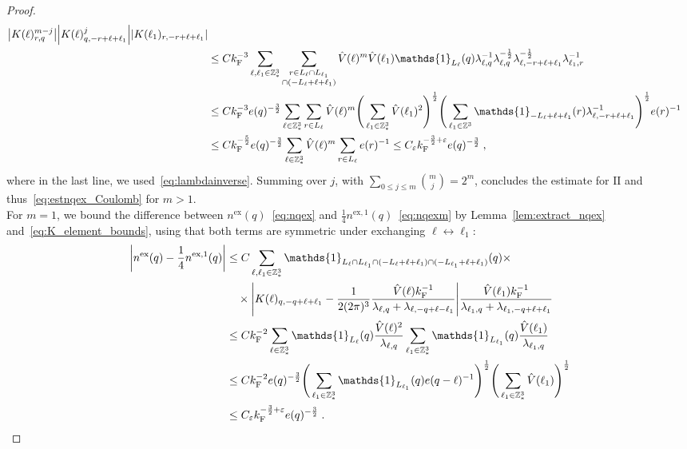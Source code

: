 \documentclass[12pt,a4paper]{article}
\numberwithin{equation}{section}
\newcommand{\1}{\mathbb{I}}
\newcommand{\ex}{\mathrm{ex}}
\newcommand{\F}{\mathrm{F}}
\newcommand{\II}{\mathrm{II}}
\newcommand{\Z}{\mathbb{Z}}
\newcommand{\half}{\frac{1}{2}}
\theoremstyle{plain}
\theoremstyle{definition}
\theoremstyle{remark}
\theoremstyle{plain}
\theoremstyle{definition}
\theoremstyle{remark}
\begin{document}
\begin{proof}
\begin{align}
		\abs{K(\ell)^{m-j}_{r,q}}
		\abs{K(\ell)^j_{q,-r+\ell+\ell_1}}
		\abs{K(\ell_1)_{r,-r+\ell+\ell_1}} \nonumber\\
	&\leq C k_{\F}^{-3} \sum_{\ell,\ell_1 \in \Z^3_*} \sum_{\substack{r \in L_\ell \cap L_{\ell_1} \\ \cap (-L_{\ell}+\ell+\ell_1)}}
		\hat{V}(\ell)^m \hat{V}(\ell_1)
		\mathds{1}_{L_\ell}(q)
		\lambda_{\ell,q}^{-1} \lambda_{\ell,q}^{-\half} \lambda_{\ell,-r+\ell+\ell_1}^{-\half} \lambda_{\ell_1,r}^{-1} \nonumber\\
	&\leq C k_{\F}^{-3} e(q)^{-\frac 32} \sum_{\ell \in \Z^3_*} \sum_{r \in L_\ell}
		\hat{V}(\ell)^m
		\Bigg( \sum_{\ell_1 \in \Z^3_*} \hat{V}(\ell_1)^2  \Bigg)^{\half}
		\Bigg( \sum_{\ell_1 \in \Z^3} \mathds{1}_{-L_{\ell}+\ell+\ell_1}(r) \lambda_{\ell,-r+\ell+\ell_1}^{-1} \Bigg)^{\half}
		 e(r)^{-1} \nonumber\\
	&\leq C k_{\F}^{-\frac 52} e(q)^{-\frac 32} \sum_{\ell \in \Z^3_*} \hat{V}(\ell)^m
	\sum_{r \in L_\ell} e(r)^{-1}
	\leq C_\varepsilon k_{\F}^{-\frac 32 + \varepsilon} e(q)^{-\frac 32} \;,
\end{align}
where in the last line, we used~\eqref{eq:lambdainverse}. Summing over $ j $, with $ \sum_{0 \le j \le m} {{m}\choose j} = 2^m $, concludes the estimate for $ \II $ and thus~\eqref{eq:estnqex_Coulomb} for $ m > 1 $.\\
For $ m = 1 $, we bound the difference between $ n^{\ex}(q) $~\eqref{eq:nqex} and $ \frac 14 n^{\ex,1}(q) $~\eqref{eq:nqexm} by Lemma~\ref{lem:extract_nqex} and~\eqref{eq:K_element_bounds}, using that both terms are symmetric under exchanging $ \ell \leftrightarrow \ell_1 $:
\begin{align*}
	\abs{n^{\ex}(q) - \frac 14 n^{\ex,1}(q)}
	&\leq C \sum_{\ell,\ell_1 \in \Z^3_*} 
		\mathds{1}_{L_\ell \cap L_{\ell_1} \cap (-L_{\ell}+\ell+\ell_1) \cap (-L_{\ell_1}+\ell+\ell_1)}(q) \times \nonumber\\
	&\quad \times \abs{K(\ell)_{q,-q+\ell+\ell_1}
		- \frac{1}{2 (2 \pi)^3} \frac{\hat{V}(\ell) k_{\F}^{-1}}{\lambda_{\ell,q} + \lambda_{\ell,-q+\ell-\ell_1}}}
		\frac{\hat{V}(\ell_1) k_{\F}^{-1}}{\lambda_{\ell_1,q} + \lambda_{\ell_1,-q+\ell+\ell_1}} \nonumber\\
	&\leq C k_{\F}^{-2} \sum_{\ell \in \Z^3_*} \mathds{1}_{L_\ell}(q)
		\frac{\hat{V}(\ell)^2}{\lambda_{\ell,q}}
		\sum_{\ell_1 \in \Z^3_*} \mathds{1}_{L_{\ell_1}}(q)
		\frac{\hat{V}(\ell_1)}{\lambda_{\ell_1,q}} \nonumber\\
	&\leq C k_{\F}^{-2} e(q)^{-\frac 32}
		\Bigg( \sum_{\ell_1 \in \Z^3_*} \mathds{1}_{L_{\ell_1}}(q) e(q-\ell)^{-1} \Bigg)^{\half}
		\Bigg( \sum_{\ell_1 \in \Z^3_*} \hat{V}(\ell_1) \Bigg)^{\half} \nonumber\\
	&\leq C_\varepsilon k_{\F}^{-\frac 32 + \varepsilon} e(q)^{-\frac 32} \;.
\end{align*}




\end{proof}
\end{document}

